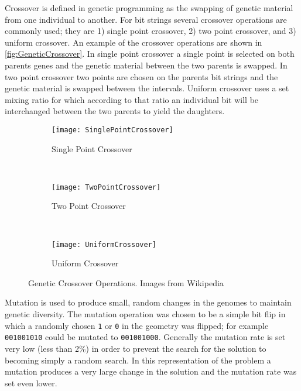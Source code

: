 Crossover is defined in genetic programming as the swapping of genetic material from one individual to another.  
For bit strings several crossover operations are commonly used; they are 1) single point crossover, 2) two point crossover, and 3) uniform crossover.
An example of the crossover operations are shown in \autoref{fig:GeneticCrossover}.
In single point crossover a single point is selected on both parents genes and the genetic material between the two parents is swapped.
In two point crossover two points are chosen on the parents bit strings and the genetic material is swapped between the intervals.
Uniform crossover uses a set mixing ratio for which according to that ratio an individual bit will be interchanged between the two parents to yield the daughters.
\begin{figure}
  \begin{subfigure}[b]{0.3\textwidth}
    \texttt{[image: SinglePointCrossover]}
    \caption{Single Point Crossover}
  \end{subfigure}
  ~
  \begin{subfigure}[b]{0.3\textwidth}
    \texttt{[image: TwoPointCrossover]}
    \caption{Two Point Crossover}
  \end{subfigure}
  ~
  \begin{subfigure}[b]{0.3\textwidth}
    \texttt{[image: UniformCrossover]}
    \caption{Uniform Crossover}
  \end{subfigure}
  \caption[Genetic Crossover Operations]{Genetic Crossover Operations. Images from Wikipedia}
  \label{fig:GeneticCrossover}
\end{figure}

Mutation is used to produce small, random changes in the genomes to maintain genetic diversity.
The mutation operation was chosen to be a simple bit flip in which a randomly chosen \verb+1+ or \verb+0+ in the geometry was flipped; for example \verb+001001010+ could be mutated to \verb+001001000+.
Generally the mutation rate is set very low (less than 2\%) in order to prevent the search for the solution to becoming simply a random search.
In this representation of the problem a mutation produces a very large change in the solution and the mutation rate was set even lower.

